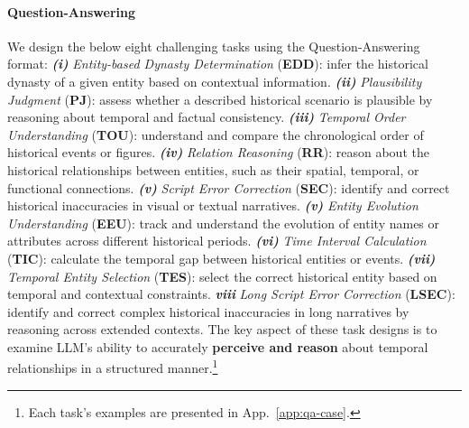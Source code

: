 \paragraph{Question-Answering} 
We design the below eight challenging tasks using the Question-Answering format:
\textbf{\textit{(i)}} \textit{Entity-based Dynasty Determination} (\textbf{EDD}): infer the historical dynasty of a given entity based on contextual information.
\textbf{\textit{(ii)}} \textit{Plausibility Judgment} (\textbf{PJ}): assess whether a described historical scenario is plausible by reasoning about temporal and factual consistency.
\textbf{\textit{(iii)}} \textit{Temporal Order Understanding} (\textbf{TOU}): understand and compare the chronological order of historical events or figures.
\textbf{\textit{(iv)}} \textit{Relation Reasoning} (\textbf{RR}): reason about the historical relationships between entities, such as their spatial, temporal, or functional connections.
\textbf{\textit{(v)}} \textit{Script Error Correction} (\textbf{SEC}): identify and correct historical inaccuracies in visual or textual narratives.
\textbf{\textit{(v)}} \textit{Entity Evolution Understanding} (\textbf{EEU}): track and understand the evolution of entity names or attributes across different historical periods.
\textbf{\textit{(vi)}} \textit{Time Interval Calculation} (\textbf{TIC}): calculate the temporal gap between historical entities or events.
\textbf{\textit{(vii)}} \textit{Temporal Entity Selection} (\textbf{TES}): select the correct historical entity based on temporal and contextual constraints.
\textbf{\textit{viii}} \textit{Long Script Error Correction} (\textbf{LSEC}): identify and correct complex historical inaccuracies in long narratives by reasoning across extended contexts.
The key aspect of these task designs is to examine LLM’s ability to accurately \textbf{perceive and reason} about temporal relationships in a structured manner.\footnote{Each task's examples are presented in App.~\ref{app:qa-case}.}


